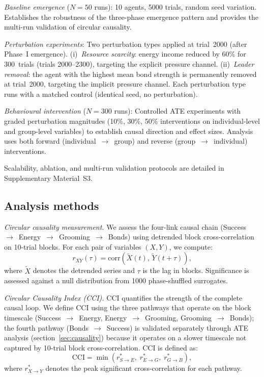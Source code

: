 \documentclass[12pt]{article}
\begin{document}
\emph{Baseline emergence} ($N = 50$ runs): 10 agents, 5000 trials, random seed variation. Establishes the robustness of the three-phase emergence pattern and provides the multi-run validation of circular causality.

\emph{Perturbation experiments}: Two perturbation types applied at trial~2000 (after Phase~I emergence). (i)~\emph{Resource scarcity}: energy income reduced by 60\% for 300~trials (trials 2000--2300), targeting the explicit pressure channel. (ii)~\emph{Leader removal}: the agent with the highest mean bond strength is permanently removed at trial~2000, targeting the implicit pressure channel. Each perturbation type runs with a matched control (identical seed, no perturbation).

\emph{Behavioural intervention} ($N = 300$ runs): Controlled ATE experiments with graded perturbation magnitudes (10\%, 30\%, 50\% interventions on individual-level and group-level variables) to establish causal direction and effect sizes. Analysis uses both forward (individual~$\to$~group) and reverse (group~$\to$~individual) interventions.

Scalability, ablation, and multi-run validation protocols are detailed in Supplementary Material~S3.


\subsection{Analysis methods}
\label{sec:analysis}

\emph{Circular causality measurement.} We assess the four-link causal chain (Success~$\to$~Energy~$\to$~Grooming~$\to$~Bonds) using detrended block cross-correlation on 10-trial blocks. For each pair of variables $(X, Y)$, we compute:
\begin{equation}
r_{XY}(\tau) = \mathrm{corr}\!\left(\tilde{X}(t),\, \tilde{Y}(t + \tau)\right),
\label{eq:crosscorr}
\end{equation}
where $\tilde{X}$ denotes the detrended series and $\tau$ is the lag in blocks. Significance is assessed against a null distribution from 1000 phase-shuffled surrogates.

\emph{Circular Causality Index (CCI).} CCI quantifies the strength of the complete causal loop. We define CCI using the three pathways that operate on the block timescale (Success~$\to$~Energy, Energy~$\to$~Grooming, Grooming~$\to$~Bonds); the fourth pathway (Bonds~$\to$~Success) is validated separately through ATE analysis (section~\ref{sec:causality}) because it operates on a slower timescale not captured by 10-trial block cross-correlation. CCI is defined as:
\begin{equation}
\mathrm{CCI} = \min\!\left(r^*_{S \to E},\; r^*_{E \to G},\; r^*_{G \to B}\right),
\label{eq:cci}
\end{equation}
where $r^*_{X \to Y}$ denotes the peak significant cross-correlation for each pathway.
\end{document}
